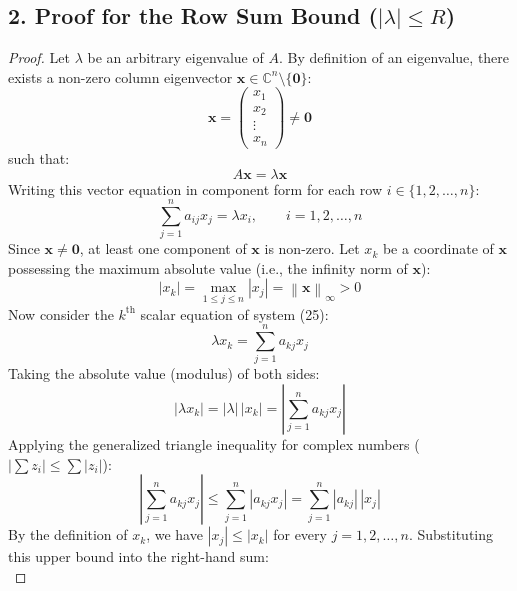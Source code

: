 \documentclass[11pt,a4paper]{article}
\newcommand{\C}{\mathbb{C}}
\newcommand{\abs}[1]{\left\lvert#1\right\rvert}
\newcommand{\norm}[1]{\left\lVert#1\right\rVert}
\begin{document}
\subsection*{2. Proof for the Row Sum Bound ($\abs{\lambda} \le R$)}
\begin{proof}
Let $\lambda$ be an arbitrary eigenvalue of $A$. By definition of an eigenvalue, there exists a non-zero column eigenvector $\mathbf{x} \in \C^n \setminus \{\mathbf{0}\}$:
\begin{equation}
\mathbf{x} = \begin{pmatrix} x_1 \\ x_2 \\ \vdots \\ x_n \end{pmatrix} \neq \mathbf{0}
\end{equation}
such that:
\begin{equation}
A\mathbf{x} = \lambda\mathbf{x}
\end{equation}
Writing this vector equation in component form for each row $i \in \{1, 2, \dots, n\}$:
\begin{equation}
\sum_{j=1}^n a_{ij} x_j = \lambda x_i, \qquad i = 1, 2, \dots, n
\end{equation}
Since $\mathbf{x} \neq \mathbf{0}$, at least one component of $\mathbf{x}$ is non-zero. Let $x_k$ be a coordinate of $\mathbf{x}$ possessing the maximum absolute value (i.e., the infinity norm of $\mathbf{x}$):
\begin{equation}
\abs{x_k} = \max_{1 \le j \le n} \abs{x_j} = \norm{\mathbf{x}}_\infty > 0
\end{equation}
Now consider the $k^{\text{th}}$ scalar equation of system (25):
\begin{equation}
\lambda x_k = \sum_{j=1}^n a_{kj} x_j
\end{equation}
Taking the absolute value (modulus) of both sides:
\begin{equation}
\abs{\lambda x_k} = \abs{\lambda} \, \abs{x_k} = \abs{\sum_{j=1}^n a_{kj} x_j}
\end{equation}
Applying the generalized triangle inequality for complex numbers ($\abs{\sum z_i} \le \sum \abs{z_i}$):
\begin{equation}
\abs{\sum_{j=1}^n a_{kj} x_j} \le \sum_{j=1}^n \abs{a_{kj} x_j} = \sum_{j=1}^n \abs{a_{kj}} \, \abs{x_j}
\end{equation}
By the definition of $x_k$, we have $\abs{x_j} \le \abs{x_k}$ for every $j = 1, 2, \dots, n$. Substituting this upper bound into the right-hand sum:
\begin{equation}

\end{equation}
\end{proof}
\end{document}
